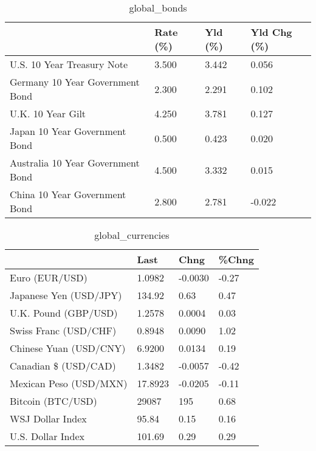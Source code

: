 \documentclass{article}%
\begin{document}
%


\begin{table}[htbp]%
\caption{global\_bonds}%
\centering%
\begin{adjustbox}{width=1\textwidth}%
\begin{tabular}{llll}
\toprule
                                  & Rate (\%) & Yld (\%) & Yld Chg (\%) \\
\midrule
       U.S. 10 Year Treasury Note &    3.500 &   3.442 &       0.056 \\
  Germany 10 Year Government Bond &    2.300 &   2.291 &       0.102 \\
                U.K. 10 Year Gilt &    4.250 &   3.781 &       0.127 \\
    Japan 10 Year Government Bond &    0.500 &   0.423 &       0.020 \\
Australia 10 Year Government Bond &    4.500 &   3.332 &       0.015 \\
    China 10 Year Government Bond &    2.800 &   2.781 &      -0.022 \\
\bottomrule
\end{tabular}
%
\end{adjustbox}%
\end{table}

%


\begin{table}[htbp]%
\caption{global\_currencies}%
\centering%
\begin{adjustbox}{width=1\textwidth}%
\begin{tabular}{llll}
\toprule
                       &    Last &    Chng & \%Chng \\
\midrule
        Euro (EUR/USD) &  1.0982 & -0.0030 & -0.27 \\
Japanese Yen (USD/JPY) &  134.92 &    0.63 &  0.47 \\
  U.K. Pound (GBP/USD) &  1.2578 &  0.0004 &  0.03 \\
 Swiss Franc (USD/CHF) &  0.8948 &  0.0090 &  1.02 \\
Chinese Yuan (USD/CNY) &  6.9200 &  0.0134 &  0.19 \\
  Canadian \$ (USD/CAD) &  1.3482 & -0.0057 & -0.42 \\
Mexican Peso (USD/MXN) & 17.8923 & -0.0205 & -0.11 \\
     Bitcoin (BTC/USD) &   29087 &     195 &  0.68 \\
      WSJ Dollar Index &   95.84 &    0.15 &  0.16 \\
     U.S. Dollar Index &  101.69 &    0.29 &  0.29 \\
\bottomrule
\end{tabular}
%
\end{adjustbox}%
\end{table}
\end{document}
